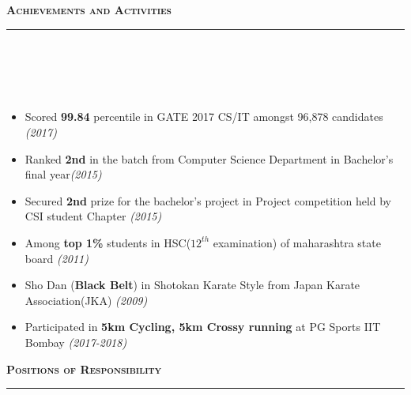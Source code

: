 \documentclass[a4paper,10pt]{article}
\newcommand{\isep}{-2 pt}
\newcommand{\lsep}{-0.5cm}
\newcommand{\resheading}[1]{{\small
        {
            \begin{minipage}
                {0.992\textwidth}\textbf{{\textsc{#1 \vphantom{p\^{E}} }}}
                \\[-0.3cm]
                \hrule
            \end{minipage}
            \\[-0.5cm]
        }
 }}
\begin{document}
\vspace{0.1cm}
\resheading{\textbf{\large Achievements and Activities}}\\[\lsep]
\\[-0.3cm]
\begin{itemize}\itemsep \isep
    \item Scored \textbf{99.84} percentile in GATE 2017 CS/IT amongst 96,878 candidates \emph{\hfill  (2017)}
    \item Ranked \textbf{2nd} in the batch from Computer Science Department in Bachelor's final year\emph{\hfill  (2015)}
    \item Secured \textbf{2nd} prize for the bachelor's project in Project competition held by CSI student Chapter
    \emph{\hfill  (2015)}
    \item Among \textbf{top 1\%} students in HSC($12^{th}$ examination) of maharashtra state board \emph{\hfill  (2011)}
    \item Sho Dan (\textbf{Black Belt}) in Shotokan Karate Style from Japan Karate Association(JKA) \emph{\hfill  (2009)}
    \item Participated in \textbf{5km Cycling, 5km Crossy running} at PG Sports IIT Bombay \emph{\hfill  (2017-2018)} \\[-0.6cm]
\end{itemize}
\vspace{0.1cm}
\resheading{\textbf{\large Positions of Responsibility}}\\[\lsep] 
\\[-0.35cm]
\end{document}
